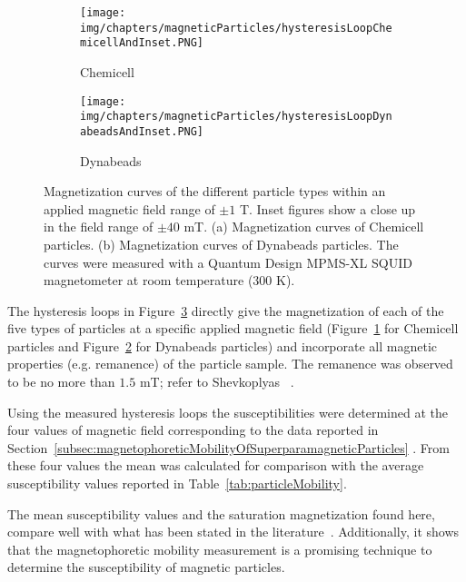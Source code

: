 \begin{figure}[htb]
        \centering
        \begin{subfigure}[b]{0.48\textwidth}
                \texttt{[image: img/chapters/magneticParticles/hysteresisLoopChemicellAndInset.PNG]}
                \caption{Chemicell}
                \label{fig:hysteresisLoopChemicell}
        \end{subfigure}
        \hfill
        \begin{subfigure}[b]{0.48\textwidth}
                \texttt{[image: img/chapters/magneticParticles/hysteresisLoopDynabeadsAndInset.PNG]}
                \caption{Dynabeads}
                \label{fig:hysteresisLoopDynabeads}
        \end{subfigure}
        \caption[Magnetization curves of Chemicell and Dynabeads particles]{Magnetization curves of the different particle types within an applied magnetic field range of $\pm1$ T. Inset figures show a close up in the field range of $\pm40$ mT. (a) Magnetization curves of Chemicell particles. (b) Magnetization curves of Dynabeads particles. The curves were measured with a Quantum Design MPMS-XL SQUID magnetometer at room temperature ($300$ K).}
\label{fig:histeresisLoopParticleManufacturer}
\end{figure}

The hysteresis loops in Figure~\ref{fig:histeresisLoopParticleManufacturer} directly give the magnetization of each of the five types of particles at a specific applied magnetic field (Figure~\ref{fig:hysteresisLoopChemicell} for Chemicell particles and Figure~\ref{fig:hysteresisLoopDynabeads} for Dynabeads particles) and incorporate all magnetic properties (e.g. remanence) of the particle sample. The  remanence was observed to be no more than $1.5$ mT; refer to Shevkoplyas \etal~\cite{Shevkoplyas2007}.

Using the measured hysteresis loops the susceptibilities were determined at the four values of magnetic field corresponding to the data reported in Section~\ref{subsec:magnetophoreticMobilityOfSuperparamagneticParticles} . From these four values the mean was calculated for comparison with the average susceptibility values reported in Table~\ref{tab:particleMobility}.

The mean susceptibility values and the saturation magnetization found here, compare well with what has been stated in the literature~\cite{Haefeli2005,Wise2015,Fonnum2005,Zborowski2002}. Additionally, it shows that the magnetophoretic mobility measurement is a promising technique to determine the susceptibility of magnetic particles. 
 
